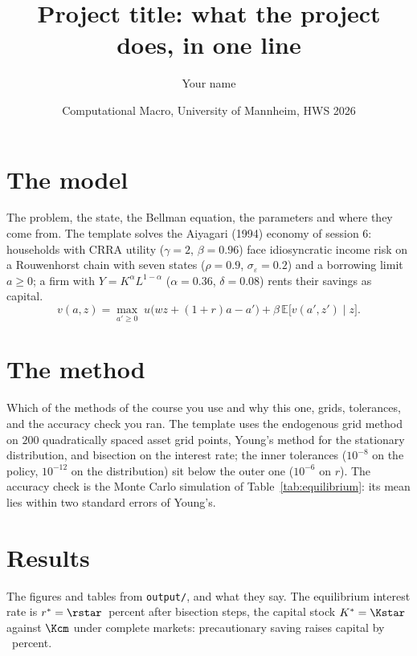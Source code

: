 \documentclass[11pt,a4paper]{article}
\title{Project title: what the project does, in one line}
\author{Your name}
\date{Computational Macro, University of Mannheim, HWS 2026}
\begin{document}
\maketitle

\section{The model}

The problem, the state, the Bellman equation, the parameters and where they come from. The template solves the
Aiyagari (1994) economy of session 6: households with CRRA utility ($\gamma = 2$, $\beta = 0.96$) face
idiosyncratic income risk on a Rouwenhorst chain with seven states ($\rho = 0.9$, $\sigma_\varepsilon = 0.2$) and
a borrowing limit $a \geq 0$; a firm with $Y = K^\alpha L^{1 - \alpha}$ ($\alpha = 0.36$, $\delta = 0.08$) rents
their savings as capital.
\begin{equation}
    v(a, z) = \max_{a' \geq 0} \; u\bigl(w z + (1 + r) a - a'\bigr) + \beta \, \mathbb{E}\bigl[v(a', z') \mid z\bigr].
\end{equation}

\section{The method}

Which of the methods of the course you use and why this one, grids, tolerances, and the accuracy check you ran.
The template uses the endogenous grid method on $200$ quadratically spaced asset grid points, Young's method
for the stationary distribution, and bisection on the interest rate; the inner tolerances ($10^{-8}$ on the
policy, $10^{-12}$ on the distribution) sit below the outer one ($10^{-6}$ on $r$). The accuracy check is the
Monte Carlo simulation of Table~\ref{tab:equilibrium}: its mean lies within two standard errors of Young's.

\section{Results}

The figures and tables from \texttt{output/}, and what they say. The equilibrium interest rate is
$r^* = \rstar$~percent after \bisectionsteps{} bisection steps, the capital stock $K^* = \Kstar$ against
$\Kcm$ under complete markets: precautionary saving raises capital by \Kgain~percent.

\begin{table}[h]
    \centering
    \caption{The stationary equilibrium of the baseline economy}
    \label{tab:equilibrium}
    
\end{table}
\end{document}
